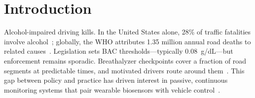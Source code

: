 \documentclass[HARVARD,Times2COL]{WileyNJDv5} %
\providecommand{\DIFadd}[1]{{\protect\color{red} #1}} %
\providecommand{\DIFaddbegin}{} %
\providecommand{\DIFaddend}{} %
\providecommand{\DIFdelbegin}{} %
\providecommand{\DIFdelend}{} %
\providecommand{\DIFscaledelfig}{0.5}
\newlength{\DIFdelgraphicswidth} %
\newlength{\DIFdelgraphicsheight} %
\providecommand{\DIFaddincludegraphics}[2][]{{\color{blue}\fbox{\DIFOincludegraphics[#1]{#2}}}} %
\providecommand{\DIFdelincludegraphics}[2][]{%
\sbox{\DIFdelgraphicsbox}{\DIFOincludegraphics[#1]{#2}}%
\settoboxwidth{\DIFdelgraphicswidth}{\DIFdelgraphicsbox} %
\settoboxtotalheight{\DIFdelgraphicsheight}{\DIFdelgraphicsbox} %
\scalebox{\DIFscaledelfig}{%
\parbox[b]{\DIFdelgraphicswidth}{\usebox{\DIFdelgraphicsbox}\\[-\baselineskip] \rule{\DIFdelgraphicswidth}{0em}}\llap{\resizebox{\DIFdelgraphicswidth}{\DIFdelgraphicsheight}{%
\setlength{\unitlength}{\DIFdelgraphicswidth}%
\begin{picture}(1,1)%
\thicklines\linethickness{2pt} %
{\color[rgb]{1,0,0}\put(0,0){\framebox(1,1){}}}%
{\color[rgb]{1,0,0}\put(0,0){\line( 1,1){1}}}%
{\color[rgb]{1,0,0}\put(0,1){\line(1,-1){1}}}%
\end{picture}%
}\hspace*{3pt}}} %
} %
\DeclareRobustCommand{\DIFaddbegin}{\DIFOaddbegin \let\includegraphics\DIFaddincludegraphics} %
\DeclareRobustCommand{\DIFaddend}{\DIFOaddend \let\includegraphics\DIFOincludegraphics} %
\DeclareRobustCommand{\DIFdelbegin}{\DIFOdelbegin \let\includegraphics\DIFdelincludegraphics} %
\DeclareRobustCommand{\DIFdelend}{\DIFOaddend \let\includegraphics\DIFOincludegraphics} %
\begin{document}
\maketitle

\renewcommand\thefootnote{}

\renewcommand\thefootnote{\fnsymbol{footnote}}
\setcounter{footnote}{1}

\section{Introduction}\label{sec1}

\DIFdelbegin %
\DIFdelend \DIFaddbegin \DIFadd{Alcohol-impaired driving kills. In the United States alone, 28\% of traffic fatalities involve alcohol~\citep{nhtsa2022}; globally, the WHO attributes 1.35 million annual road deaths to related causes~\citep{who2018}. Legislation sets BAC thresholds---typically 0.08~g/dL---but enforcement remains sporadic. Breathalyzer checkpoints cover a fraction of road segments at predictable times, and motivated drivers route around them~\citep{das2023, lombardo2020l}. This gap between policy and practice has driven interest in passive, continuous monitoring systems that pair wearable biosensors with vehicle control~\citep{watchover}.
}\DIFaddend 
\end{document}
